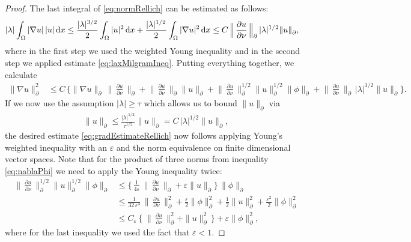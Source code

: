 \begin{proof}
  The last integral of \eqref{eq:normRellich} can be estimated as follows:
  \begin{align}
\label{eq:lambdaNablaU}
    |\lambda| \int_\Omega |\nabla u| \, |u| \, {\operatorname{d}\!{x}} 
    &\leq  \frac{|\lambda|^{3/2}}{2} \int_\Omega |u|^2 \, {\operatorname{d}\!{x}} + \frac{|\lambda|^{1/2}}{2 } \int_\Omega |\nabla u|^2 \, {\operatorname{d}\!{x}} \leq C \, \Big\| \, \frac{\partial u}{\partial \nu} \, \Big\|^{}_\partial \, |\lambda|^{1/2}  \| u \|^{}_\partial, 
  \end{align}
  where in the first step we used the weighted Young inequality and in the second step we applied estimate \eqref{eq:laxMilgramIneq}.
  Putting everything together, we calculate
  \begin{align*}
    \| \nabla u\|_\partial^2 
    &\leq C\, \bigg\{ \| \nabla u\|^{}_\partial \, \Big\|\,\frac{\partial u}{\partial \nu} \, \Big\|^{}_\partial 
    + \Big\|\,\frac{\partial u}{\partial \nu}\,\Big\|^{}_\partial \|u\|^{}_\partial 
    + \Big\|\,\frac{\partial u}{\partial \nu}\,\Big\|_\partial^{1/2} \|u\|_\partial^{1/2} \|\phi\|^{}_\partial 
    + \Big\|\,\frac{\partial u}{\partial \nu}\,\Big\|^{}_\partial \, |\lambda|^{1/2} \big\|  u \big\|^{}_\partial\bigg\}.
  \end{align*}
  If we now use the assumption $|\lambda| \geq \tau$ which allows us to bound $\|u\|^{}_\partial$ via
  \begin{align*}
      \|u\|^{}_\partial \leq \frac{|\lambda|^{1/2}}{\tau^{1/2}} \|u\|^{}_\partial = C \, |\lambda|^{1/2} \|u\|^{}_{\partial},
  \end{align*}
  the desired estimate \eqref{eq:gradEstimateRellich} now follows applying Young's weighted inequality with an $\varepsilon$ and the norm equivalence on finite dimensional vector spaces. 
  Note that for the product of three norms from inequality \eqref{eq:nablaPhi} we need to apply the Young inequality twice:
  \begin{align*}
      \Big\| \, \frac{\partial u}{\partial \nu} \, \Big\|_\partial^{1/2} \|u\|_\partial^{1/2} \|\phi\|^{}_\partial 
      &\leq \Big\{\, \frac{1}{4 \varepsilon}\, \Big\|\, \frac{\partial u}{\partial \nu}\, \Big\|^{}_\partial 
  + \varepsilon \|u\|^{}_\partial \Big\} \, \|\phi\|^{}_\partial  \\[0.5em]
  &\leq \frac{1}{32\, \varepsilon^3} \, \Big\|\, \frac{\partial u}{\partial \nu} \, \Big\|_\partial^2 + \frac{\varepsilon}{2} \|\phi\|_\partial^2 + \frac{1}{2} \|u\|_\partial^2 + \frac{\varepsilon^2}{2} \|\phi\|_\partial^2 \\[0.5em]
  &\leq C_\varepsilon\, \Big\{ \; \Big\|\, \frac{\partial u}{\partial\nu} \, \Big\|_\partial^2 + \|u\|_\partial^2 \,\Big\} + \varepsilon \|\phi\|_\partial^2,
  \end{align*}
  where for the last inequality we used the fact that $\varepsilon < 1$.


\end{proof}
